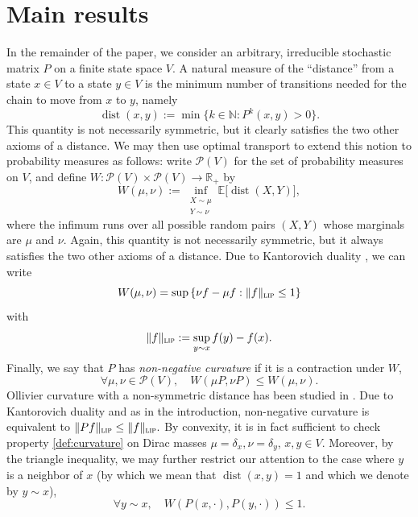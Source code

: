 \documentclass[10pt]{amsart}
\theoremstyle{definition}
\newcommand{\dN}{\mathbb {N}}
\newcommand{\dR}{\mathbb {R}}
\newcommand{\EE}{{\mathbb{E}}}
\newcommand{\cP}{\mathcal{P}}
\newcommand{\lip}{\textup{\textsc{lip}}}
\DeclareMathOperator{\dist}{dist}
\begin{document}
\section{Main results}
\label{sec:main}

In the remainder of the paper, we consider an arbitrary, irreducible stochastic matrix $P$ on a finite state space $V$. A natural measure of the ``distance'' from a state $x\in V$ to a state $y\in V$ is the minimum number of transitions needed for the chain to move from $x$ to $y$, namely
\begin{equation*}
\dist(x,y) := \min\{k\in\dN\colon P^k(x,y)>0\}.
\end{equation*}
This quantity is not necessarily symmetric, but it clearly satisfies the two other axioms of a distance. We may then use optimal transport to extend this notion to probability measures as follows: write $\cP(V)$ for the set of probability measures on $V$, and define $W\colon \cP(V)\times\cP(V)\to\dR_+$ by
\begin{equation*}
W(\mu,\nu) := \inf_{\substack{X\sim\mu\\Y\sim\nu}}
\EE\bigl[\dist(X,Y)\bigr],
\end{equation*}
where the infimum runs over all possible random pairs $(X,Y)$ whose marginals are $\mu$ and $\nu$. Again, this quantity is not necessarily symmetric, but it always satisfies the two other axioms of a distance.
Due to Kantorovich duality \cite[Th.\,5.10 \& Particular Case 5.4]{villani2009optimal}, we can write
\[
W(\mu,\nu) = \sup \left\{ \nu f - \mu f : \|f\|_{\lip} \leq 1 \right\}
\]
with
\[
\|f\|_\lip := \sup_{y\sim x} f(y)-f(x).
\]
Finally, we say that $P$ has \emph{non-negative curvature} if it is a contraction under $W$, \ie
\begin{equation}
\label{def:curvature}
\forall \mu,\nu\in\cP(V),\quad
W(\mu P,\nu P) \le W(\mu,\nu).
\end{equation}
Ollivier curvature with a non-symmetric distance has been studied in \cite{yamada2016ricci,ozawa2020geometric,eidi2020ollivierJournal,ozawa2022heat}.
Due to Kantorovich duality and as in the introduction, non-negative curvature is equivalent to
$
\|Pf\|_\lip \leq \|f\|_\lip.
$
By convexity, it is in fact sufficient to check property \eqref{def:curvature} on Dirac masses $\mu=\delta_x,\nu=\delta_y$, $x,y\in V$. Moreover, by the triangle inequality, we may further restrict our attention to the case where $y$ is a neighbor of $x$ (by which we mean that $\dist(x,y)=1$ and which we denote by $y\sim x$), \ie
\begin{equation}
\label{def:local}
\forall y\sim x, \quad
W\left(P(x,\cdot),P(y,\cdot)\right) \le 1.
\end{equation}
\end{document}

